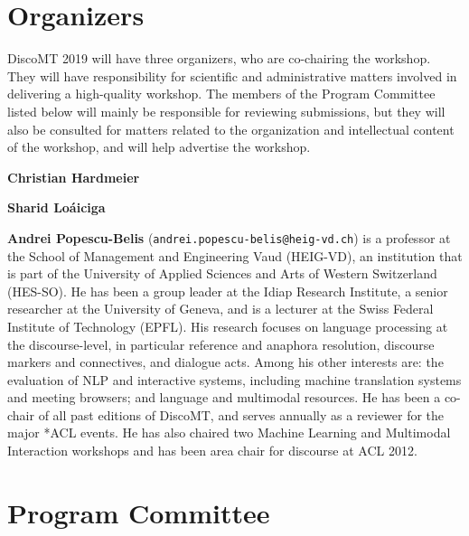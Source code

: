 \documentclass[11pt]{article}
\begin{document}
\section{Organizers}

DiscoMT 2019 will have three organizers, who are co-chairing the workshop.  They will have responsibility for scientific and administrative matters involved in delivering a high-quality workshop.  The members of the Program Committee listed below will mainly be responsible for reviewing submissions, but they will also be consulted for matters related to the organization and intellectual content of the workshop, and will help advertise the workshop.


\textbf{Christian Hardmeier}


\textbf{Sharid Loáiciga}

\textbf{Andrei Popescu-Belis} (\texttt{andrei.popescu-belis@heig-vd.ch}) is a professor at the School of Management and Engineering Vaud (HEIG-VD), an institution that is part of the University of Applied Sciences and Arts of Western Switzerland (HES-SO).  He has been a group leader at the Idiap Research Institute, a senior researcher at the University of Geneva, and is a lecturer at the Swiss Federal Institute of Technology (EPFL).  His research focuses on language processing at the discourse-level, in particular reference and anaphora resolution, discourse markers and connectives, and dialogue acts.  Among his other interests are: the evaluation of NLP and interactive systems, including machine translation systems and meeting browsers; and language and multimodal resources.  He has been a co-chair of all past editions of DiscoMT, and serves annually as a reviewer for the major *ACL events.  He has also chaired two Machine Learning and Multimodal Interaction workshops and has been area chair for discourse at ACL 2012.


\section{Program Committee}

\end{document}
